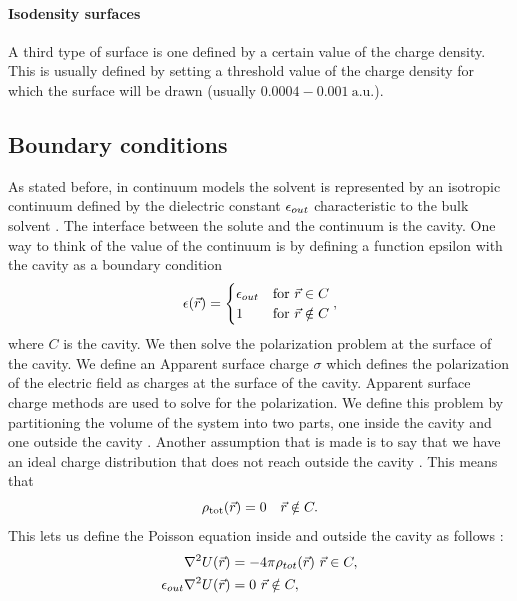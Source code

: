\documentclass[../Thesis.tex]{subfiles}
\begin{document}
\paragraph{Isodensity surfaces}
A third type of surface is one defined by a certain value of the charge density.
This is usually defined by setting a threshold value of the charge density for
which the surface will be drawn (usually $0.0004-0.001\ \text{a.u.}$)\cite{Tomasi:2005ipa}.


\subsection{Boundary conditions}
As stated before, in continuum models the solvent is represented by an isotropic
continuum defined by the dielectric constant $\epsilon_{out}$ characteristic to the bulk
solvent \cite{Tomasi:1994wt}. The interface between the solute and the continuum
is the cavity. One way to think of the value of the continuum is by defining a
function epsilon with the cavity as a boundary condition \cite{Tomasi:2005ipa, Tomasi:1994wt}
\begin{equation}
  \epsilon(\vec{r}) =
  \begin{cases}
  \epsilon_{out} & \text{for} \ \vec{r}\in C\\
  1 & \text{for}\ \vec{r} \notin C
\end{cases},
\end{equation}
where $C$ is the cavity. We then solve the polarization problem at the surface
of the cavity. We define an Apparent surface charge $\sigma$ which defines the
polarization of the electric field as charges at the surface of the cavity. Apparent surface
charge methods are used to solve for the polarization.
 We define this problem by partitioning the volume of the system
into two parts, one inside the cavity and one outside the cavity \cite{Tomasi:1994wt}.
Another assumption that is made is to say that we have an ideal charge distribution
that does not reach outside the cavity \cite{Cramer:2004, Tomasi:1994wt}.
This means that \cite{Tomasi:1994wt}
\begin{equation}
  \rho_{\mathrm{tot}}(\vec{r})=0 \quad \vec{r} \notin C.
\end{equation}
This lets us define the Poisson equation inside and outside the cavity as follows
\cite{Sorland, Tomasi:1994wt}:
\begin{align}
  \begin{split}
    \nabla^2U(\vec{r}) &= -4\pi\rho_{tot}(\vec{r})\ \vec{r}\in C,\\
    \epsilon_{out}\nabla^2U(\vec{r}) &= 0 \ \vec{r} \notin C,
  \end{split}
\end{align}
\end{document}
